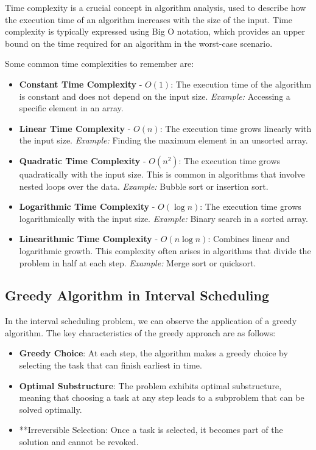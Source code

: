 \documentclass{article}
\begin{document}
Time complexity is a crucial concept in algorithm analysis, used to describe how the execution time of an algorithm increases with the size of the input. Time complexity is typically expressed using Big O notation, which provides an upper bound on the time required for an algorithm in the worst-case scenario.

Some common time complexities to remember are:

\begin{itemize}
    \item \textbf{Constant Time Complexity} - \(O(1)\): The execution time of the algorithm is constant and does not depend on the input size. 
    \textit{Example:} Accessing a specific element in an array.

    \item \textbf{Linear Time Complexity} - \(O(n)\): The execution time grows linearly with the input size. 
    \textit{Example:} Finding the maximum element in an unsorted array.

    \item \textbf{Quadratic Time Complexity} - \(O(n^2)\): The execution time grows quadratically with the input size. This is common in algorithms that involve nested loops over the data.
    \textit{Example:} Bubble sort or insertion sort.

    \item \textbf{Logarithmic Time Complexity} - \(O(\log n)\): The execution time grows logarithmically with the input size. 
    \textit{Example:} Binary search in a sorted array.

    \item \textbf{Linearithmic Time Complexity} - \(O(n \log n)\): Combines linear and logarithmic growth. This complexity often arises in algorithms that divide the problem in half at each step. 
    \textit{Example:} Merge sort or quicksort.
\end{itemize}
\subsection{Greedy Algorithm in Interval Scheduling}

In the interval scheduling problem, we can observe the application of a greedy algorithm. The key characteristics of the greedy approach are as follows:

\begin{itemize}
    \item \textbf{Greedy Choice}: At each step, the algorithm makes a greedy choice by selecting the task that can finish earliest in time.
    
    \item \textbf{Optimal Substructure}: The problem exhibits optimal substructure, meaning that choosing a task at any step leads to a subproblem that can be solved optimally.
    
    \item **Irreversible Selection: Once a task is selected, it becomes part of the solution and cannot be revoked.
\end{itemize}
\end{document}
